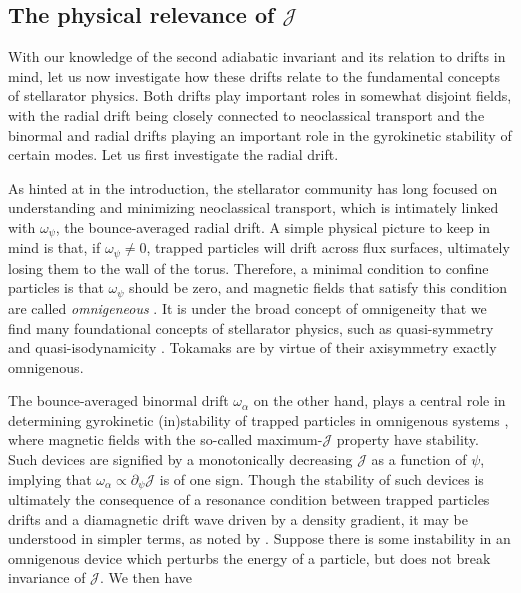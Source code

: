 \subsection*{The physical relevance of $\mathcal{J}$}
With our knowledge of the second adiabatic invariant and its relation to drifts in mind, let us now investigate how these drifts relate to the fundamental concepts of stellarator physics. Both drifts play important roles in somewhat disjoint fields, with the radial drift being closely connected to neoclassical transport and the binormal and radial drifts playing an important role in the gyrokinetic stability of certain modes. Let us first investigate the radial drift.  \par 
As hinted at in the introduction, the stellarator community has long focused on understanding and minimizing neoclassical transport, which is intimately linked with $\omega_\psi$, the bounce-averaged radial drift. A simple physical picture to keep in mind is that, if $\omega_\psi \neq 0$, trapped particles will drift across flux surfaces, ultimately losing them to the wall of the torus. Therefore, a minimal condition to confine particles is that $\omega_\psi$ should be zero, and magnetic fields that satisfy this condition are called \textit{omnigeneous} \cite{catto1981omnigenous}. It is under the broad concept of omnigeneity that we find many foundational concepts of stellarator physics, such as quasi-symmetry \cite{boozer1983transport,landreman2012omnigenity,landreman2022magnetic,rodriguez2020necessary,rodriguez2022quasisymmetry} and quasi-isodynamicity \cite{nuhrenberg2010development,goodman2022constructing}. Tokamaks are by virtue of their axisymmetry exactly omnigenous. \par 
The bounce-averaged binormal drift $\omega_\alpha$ on the other hand, plays a central role in determining gyrokinetic (in)stability of trapped particles in omnigenous systems \cite{rosenbluth1971finite,proll2012resilience,helander2013collisionless}, where magnetic fields with the so-called maximum-$\mathcal{J}$ property have stability. Such devices are signified by a monotonically decreasing $\mathcal{J}$ as a function of $\psi$, implying that $\omega_\alpha \propto \partial_\psi \mathcal{J}$ is of one sign. Though the stability of such devices is ultimately the consequence of a resonance condition between trapped particles drifts and a diamagnetic drift wave driven by a density gradient, it may be understood in simpler terms, as noted by \citet{helander2012stellarator}. Suppose there is some instability in an omnigenous device which perturbs the energy of a particle, but does not break invariance of $\mathcal{J}$. We then have
